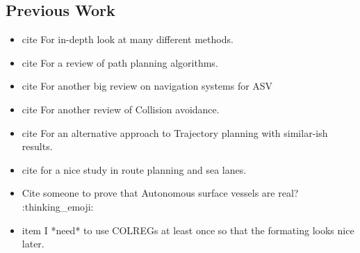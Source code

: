 \subsection{Previous Work}
\begin{itemize}
    \item cite \cite{loe2007collision} For in-depth look at many different methods.
    \item cite \cite{vagale2021path} For a review of path planning algorithms.
    \item cite \cite{zhang2021collision} For another big review on navigation systems for ASV
    \item cite \cite{huang2020ship} For another review of Collision avoidance.
    \item cite \cite{park2020social} For an alternative approach to Trajectory planning with similar-ish results.
    \item cite \cite{vestad2019automatic} for a nice study in route planning and sea lanes.
    \item Cite someone to prove that Autonomous surface vessels are real? :thinking\_emoji:
    \item item I *need* to use \gls{COLREGs} at least once so that the formating looks nice later.
\end{itemize}

